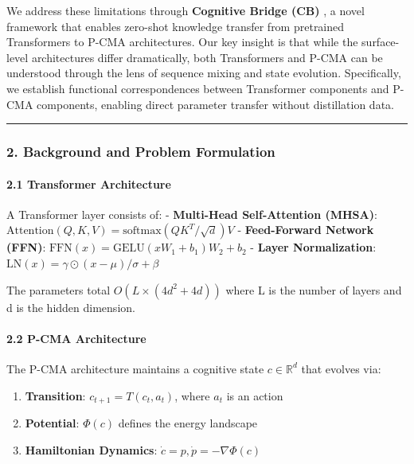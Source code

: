 \documentclass[
  11pt,
  a4paper,
]{article}
\providecommand{\tightlist}{%
  \setlength{\itemsep}{0pt}\setlength{\parskip}{0pt}}
\begin{document}
We address these limitations through \textbf{Cognitive Bridge (CB)} , a
novel framework that enables zero-shot knowledge transfer from
pretrained Transformers to P-CMA architectures. Our key insight is that
while the surface-level architectures differ dramatically, both
Transformers and P-CMA can be understood through the lens of sequence
mixing and state evolution. Specifically, we establish functional
correspondences between Transformer components and P-CMA components,
enabling direct parameter transfer without distillation data.

\begin{center}\rule{0.5\linewidth}{0.5pt}\end{center}

\subsubsection{2. Background and Problem
Formulation}\label{background-and-problem-formulation}

\paragraph{2.1 Transformer Architecture}\label{transformer-architecture}

A Transformer layer consists of: - \textbf{Multi-Head Self-Attention
(MHSA)}: \(\text{Attention}(Q, K, V) = \text{softmax}(QK^T/\sqrt{d})V\)
- \textbf{Feed-Forward Network (FFN)}:
\(\text{FFN}(x) = \text{GELU}(xW_1 + b_1)W_2 + b_2\) - \textbf{Layer
Normalization}: \(\text{LN}(x) = \gamma \odot (x - \mu)/\sigma + \beta\)

The parameters total \(O(L \times (4d^2 + 4d))\) where L is the number
of layers and d is the hidden dimension.

\paragraph{2.2 P-CMA Architecture}\label{p-cma-architecture}

The P-CMA architecture maintains a cognitive state
\(c \in \mathbb{R}^d\) that evolves via:

\begin{enumerate}
\def\labelenumi{\arabic{enumi}.}
\tightlist
\item
  \textbf{Transition}: \(c_{t+1} = T(c_t, a_t)\), where \(a_t\) is an
  action
\item
  \textbf{Potential}: \(\Phi(c)\) defines the energy landscape
\item
  \textbf{Hamiltonian Dynamics}:
  \(\dot{c} = p, \dot{p} = -\nabla\Phi(c)\)
\end{enumerate}
\end{document}
